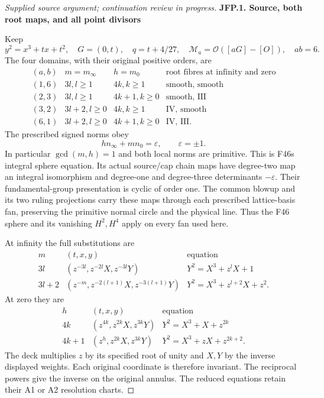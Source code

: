 \begin{proof}[Supplied source argument; continuation review in progress]
\medskip\noindent\textbf{JFP.1. Source, both root maps, and all point divisors}

\par\nobreak

Keep
\[
 y^2=x^3+tx+t^2,\quad G=(0,t),\quad q=t+4/27,
 \quad \mathcal M_a=\mathcal O([aG]-[O]),\quad ab=6.
\tag{JFP.1}
\]
The four domains, with their original positive orders, are
\[
\begin{array}{c|c|c|c}
(a,b)&m=m_\infty&h=m_0&\text{root fibres at infinity and zero}\\\hline
(1,6)&3l, l\ge1&4k, k\ge1&\text{smooth, smooth}\\
(2,3)&3l, l\ge1&4k+1, k\ge0&\text{smooth, III}\\
(3,2)&3l+2, l\ge0&4k, k\ge1&\text{IV, smooth}\\
(6,1)&3l+2, l\ge0&4k+1, k\ge0&\text{IV, III}.
\end{array}
\tag{JFP.2}
\]
The prescribed signed norms obey
\[
 h n_\infty+m n_0=\varepsilon,\qquad \varepsilon=\pm1.
\tag{JFP.3}
\]
In particular \(\gcd(m,h)=1\) and both local norms are primitive.
This is F46\textquotesingle s integral sphere equation. Its actual source/cap
chain maps have degree-two map an integral isomorphism and
degree-one and degree-three determinants \(-\varepsilon\).
Their fundamental-group presentation is cyclic of order one.
The common blowup and its two ruling projections carry these maps
through each prescribed lattice-basis fan, preserving the primitive
normal circle and the physical line. Thus the F46 sphere and its
vanishing \(H^2,H^4\) apply on every fan used here.

At infinity the full substitutions are
\[
\begin{array}{c|c|c}
m&(t,x,y)&\text{equation}\\\hline
3l&(z^{-3l},z^{-2l}X,z^{-3l}Y)&Y^2=X^3+z^lX+1\\
3l+2&(z^{-m},z^{-2(l+1)}X,z^{-3(l+1)}Y)&
Y^2=X^3+z^{l+2}X+z^2.
\end{array}
\tag{JFP.4}
\]
At zero they are
\[
\begin{array}{c|c|c}
h&(t,x,y)&\text{equation}\\\hline
4k&(z^{4k},z^{2k}X,z^{3k}Y)&Y^2=X^3+X+z^{2k}\\
4k+1&(z^h,z^{2k}X,z^{3k}Y)&Y^2=X^3+zX+z^{2k+2}.
\end{array}
\tag{JFP.5}
\]
The deck multiplies \(z\) by its specified root of unity and
\(X,Y\) by the inverse displayed weights. Each original coordinate
is therefore invariant. The reciprocal powers give the inverse
on the original annulus. The reduced equations retain their A1 or
A2 resolution charts.


\end{proof}
